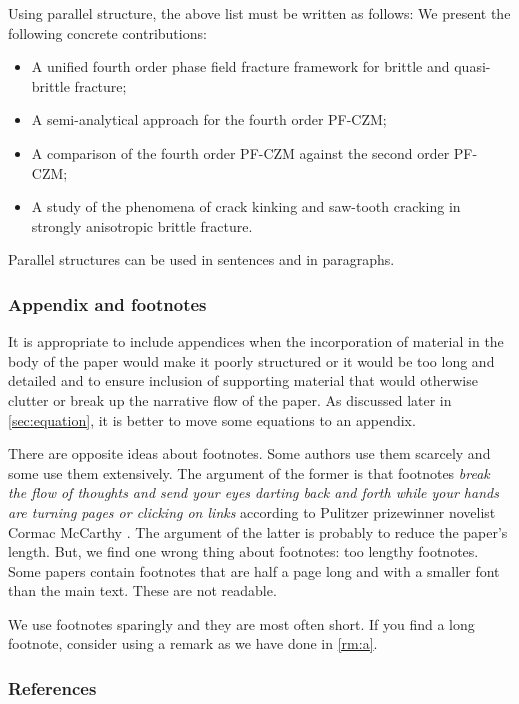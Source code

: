 \documentclass[authoryear,12pta4paper,fleqn]{article}
\numberwithin{equation}{section}
\theoremstyle{remark}
\begin{document}
Using parallel structure, the above list must be written as follows: We present the following concrete contributions:
\begin{itemize}
	\item A unified fourth order phase field fracture framework for brittle and quasi-brittle fracture;
\item A semi-analytical approach for the fourth order PF-CZM;
\item A comparison of the fourth order PF-CZM against the second order PF-CZM;
\item A study of the phenomena of crack kinking and saw-tooth cracking in strongly anisotropic brittle fracture.
\end{itemize}

Parallel structures can be used in sentences and in paragraphs. 

\subsubsection{Appendix and footnotes}\label{sec:appendix-footnotes}

It is appropriate to include appendices when
the incorporation of material in the body of the paper would make it poorly structured or it would be too long and detailed and to ensure inclusion of supporting material that would otherwise clutter or break up the narrative flow of the paper.
As discussed later in \cref{sec:equation}, it is better to move some equations to an appendix.

There are opposite ideas about footnotes. Some authors use them scarcely and some use them extensively. The argument of the former is that footnotes \textit{break the flow of thoughts and send your eyes darting back and forth while your hands are turning pages or clicking on links} according to Pulitzer prizewinner novelist Cormac McCarthy \citep{McCarthy}. The argument of the latter is probably to reduce the paper's length. But, we find one wrong thing about footnotes: too lengthy footnotes. Some papers contain footnotes that are half a page long and with a smaller font than the main text. These are not readable.

We use footnotes sparingly and they are most often short. If you find a long footnote, consider using a remark as we have done in \cref{rm:a}.

\subsubsection{References}\label{sec:references}
\end{document}
